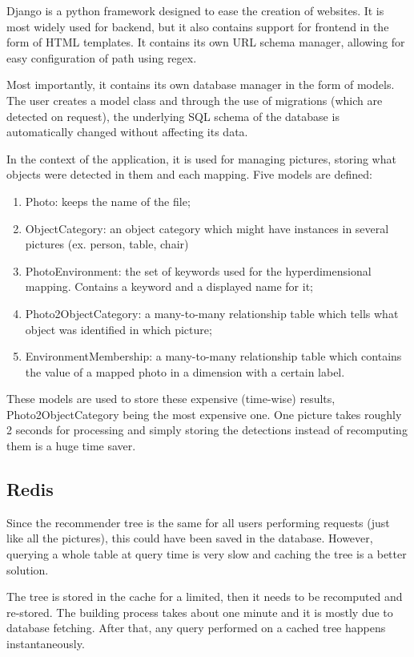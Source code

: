 Django is a python framework designed to ease the creation of websites. It is most widely used for backend, but it also contains support for frontend in the form of HTML templates. It contains its own URL schema manager, allowing for easy configuration of path using regex.

Most importantly, it contains its own database manager in the form of models. The user creates a model class and through the use of migrations (which are detected on request), the underlying SQL schema of the database is automatically changed without affecting its data.

In the context of the application, it is used for managing pictures, storing what objects were detected in them and each mapping. Five models are defined:

\begin{enumerate}
\item{Photo: keeps the name of the file;}
\item{ObjectCategory: an object category which might have instances in several pictures (ex. person, table, chair)}
\item{PhotoEnvironment: the set of keywords used for the hyperdimensional mapping. Contains a keyword and a displayed name for it;}
\item{Photo2ObjectCategory: a many-to-many relationship table which tells what object was identified in which picture;}
\item{EnvironmentMembership: a many-to-many relationship table which contains the value of a mapped photo in a dimension with a certain label.}
\end{enumerate}

These models are used to store these expensive (time-wise) results, Photo2ObjectCategory being the most expensive one. One picture takes roughly 2 seconds for processing and simply storing the detections instead of recomputing them is a huge time saver.

\subsection{Redis}
\label{subsec:app_architecture_redis}

Since the recommender tree is the same for all users performing requests (just like all the pictures), this could have been saved in the database. However, querying a whole table at query time is very slow and caching the tree is a better solution. 

The tree is stored in the cache for a limited, then it needs to be recomputed and re-stored. The building process takes about one minute and it is mostly due to database fetching. After that, any query performed on a cached tree happens instantaneously.

